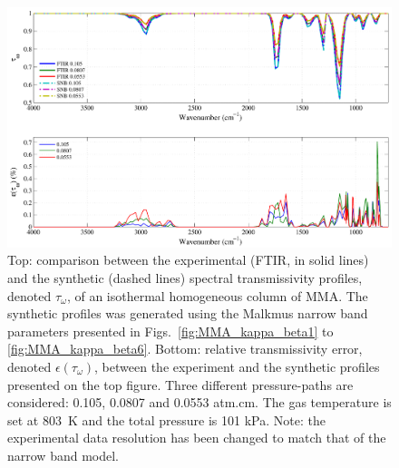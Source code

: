 \begin{figure}[p]
\includegraphics[width=\textwidth]{Figures/Comparison_Fit_MMA_MALKMUS_Temp803K.pdf}
\caption{Top: comparison between the experimental (FTIR, in solid lines) and the synthetic (dashed lines) spectral transmissivity profiles, denoted $\tau_{\omega}$, of an isothermal homogeneous column of MMA. The synthetic profiles was generated using the Malkmus narrow band parameters presented in Figs.~\ref{fig:MMA_kappa_beta1} to \ref{fig:MMA_kappa_beta6}. Bottom: relative transmissivity error, denoted $\epsilon{(\tau_{\omega})}$, between the experiment and the synthetic profiles presented on the top figure. Three different pressure-paths are considered: 0.105, 0.0807 and 0.0553 atm.cm. The gas temperature is set at 803~K and the total pressure is 101 kPa. Note: the experimental data resolution has been changed to match that of the narrow band model. \label{fig:MMA_SNBVerify_803K}}
\end{figure}

